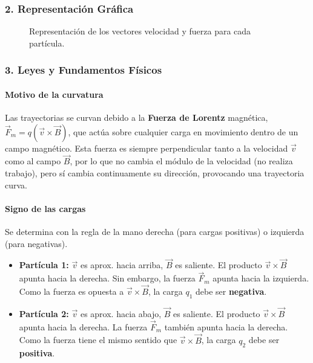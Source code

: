 \subsubsection*{2. Representación Gráfica}
\begin{figure}[H]
    \centering
    \caption{Representación de los vectores velocidad y fuerza para cada partícula.}
\end{figure}

\subsubsection*{3. Leyes y Fundamentos Físicos}
\paragraph*{Motivo de la curvatura}
Las trayectorias se curvan debido a la \textbf{Fuerza de Lorentz} magnética, $\vec{F}_m = q(\vec{v} \times \vec{B})$, que actúa sobre cualquier carga en movimiento dentro de un campo magnético. Esta fuerza es siempre perpendicular tanto a la velocidad $\vec{v}$ como al campo $\vec{B}$, por lo que no cambia el módulo de la velocidad (no realiza trabajo), pero sí cambia continuamente su dirección, provocando una trayectoria curva.

\paragraph*{Signo de las cargas}
Se determina con la regla de la mano derecha (para cargas positivas) o izquierda (para negativas).
\begin{itemize}
    \item \textbf{Partícula 1:} $\vec{v}$ es aprox. hacia arriba, $\vec{B}$ es saliente. El producto $\vec{v} \times \vec{B}$ apunta hacia la derecha. Sin embargo, la fuerza $\vec{F}_m$ apunta hacia la izquierda. Como la fuerza es opuesta a $\vec{v} \times \vec{B}$, la carga $q_1$ debe ser \textbf{negativa}.
    \item \textbf{Partícula 2:} $\vec{v}$ es aprox. hacia abajo, $\vec{B}$ es saliente. El producto $\vec{v} \times \vec{B}$ apunta hacia la derecha. La fuerza $\vec{F}_m$ también apunta hacia la derecha. Como la fuerza tiene el mismo sentido que $\vec{v} \times \vec{B}$, la carga $q_2$ debe ser \textbf{positiva}.
\end{itemize}

